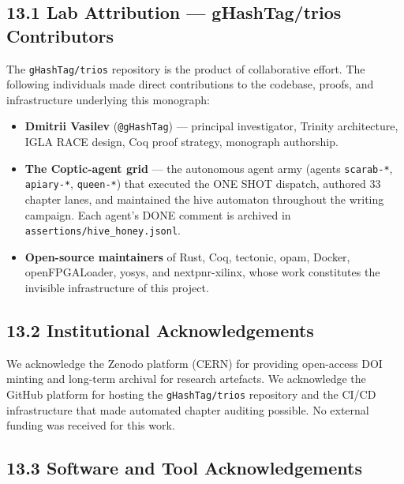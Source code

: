 \subsection{13.1 Lab Attribution — gHashTag/trios Contributors}%
\label{sec:lab-attribution}

The \texttt{gHashTag/trios} repository is the product of collaborative
effort.  The following individuals made direct contributions to the
codebase, proofs, and infrastructure underlying this monograph:

\begin{itemize}
\item \textbf{Dmitrii Vasilev} (\texttt{@gHashTag}) --- principal
  investigator, Trinity architecture, IGLA RACE design, Coq proof
  strategy, monograph authorship.
\item \textbf{The Coptic-agent grid} --- the autonomous agent army
  (agents \texttt{scarab-*}, \texttt{apiary-*}, \texttt{queen-*})
  that executed the ONE SHOT dispatch, authored 33 chapter lanes, and
  maintained the hive automaton throughout the writing campaign.  Each
  agent's DONE comment is archived in \texttt{assertions/hive\_honey.jsonl}.
\item \textbf{Open-source maintainers} of Rust, Coq, tectonic, opam,
  Docker, openFPGALoader, yosys, and nextpnr-xilinx, whose work
  constitutes the invisible infrastructure of this project.
\end{itemize}

\subsection{13.2 Institutional Acknowledgements}\label{sec:institutional}

We acknowledge the Zenodo platform (CERN) for providing open-access DOI
minting and long-term archival for research artefacts.  We acknowledge
the GitHub platform for hosting the \texttt{gHashTag/trios} repository
and the CI/CD infrastructure that made automated chapter auditing
possible.  No external funding was received for this work.

\subsection{13.3 Software and Tool Acknowledgements}\label{sec:tool-ack}

